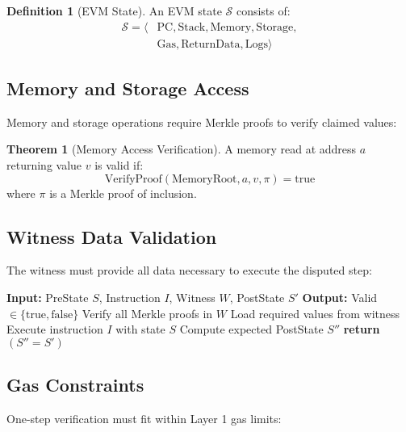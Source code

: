 \documentclass[11pt,a4paper]{article}
\theoremstyle{definition}
\newtheorem{definition}{Definition}[section]
\newtheorem{theorem}{Theorem}[section]
\begin{document}
\begin{definition}[EVM State]
An EVM state $\mathcal{S}$ consists of:
\begin{align}
\mathcal{S} = \langle &\text{PC}, \text{Stack}, \text{Memory}, \text{Storage}, \\
&\text{Gas}, \text{ReturnData}, \text{Logs} \rangle
\end{align}
\end{definition}

\subsection{Memory and Storage Access}

Memory and storage operations require Merkle proofs to verify claimed values:

\begin{theorem}[Memory Access Verification]
A memory read at address $a$ returning value $v$ is valid if:
\begin{equation}
\text{VerifyProof}(\text{MemoryRoot}, a, v, \pi) = \text{true}
\end{equation}
where $\pi$ is a Merkle proof of inclusion.
\end{theorem}

\subsection{Witness Data Validation}

The witness must provide all data necessary to execute the disputed step:

\begin{algorithm}
\caption{One-Step Verification}
\begin{algorithmic}[1]
\State \textbf{Input:} PreState $S$, Instruction $I$, Witness $W$, PostState $S'$
\State \textbf{Output:} Valid $\in \{\text{true}, \text{false}\}$
\State Verify all Merkle proofs in $W$
\State Load required values from witness
\State Execute instruction $I$ with state $S$
\State Compute expected PostState $S''$
\State \textbf{return} $(S'' = S')$
\end{algorithmic}
\end{algorithm}

\subsection{Gas Constraints}

One-step verification must fit within Layer 1 gas limits:
\end{document}
